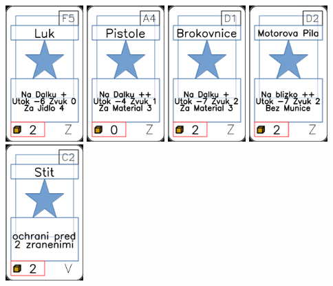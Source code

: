 \documentclass[a4paper]{article}
\begin{document}
	\includegraphics[width=3.0cm]{img-1_89}
	\includegraphics[width=3.0cm]{img-1_93}
	\includegraphics[width=3.0cm]{img-1_105}
	\includegraphics[width=3.0cm]{img-1_106}
	\includegraphics[width=3.0cm]{img-1_71}
\end{document}

